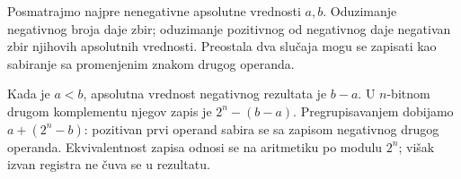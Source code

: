 Posmatrajmo najpre nenegativne apsolutne vrednosti $a,b$. Oduzimanje negativnog broja daje zbir; oduzimanje pozitivnog od negativnog daje negativan zbir njihovih apsolutnih vrednosti. Preostala dva slučaja mogu se zapisati kao sabiranje sa promenjenim znakom drugog operanda.

Kada je $a<b$, apsolutna vrednost negativnog rezultata je $b-a$. U $n$-bitnom drugom komplementu njegov zapis je $2^n-(b-a)$. Pregrupisavanjem dobijamo $a+(2^n-b)$: pozitivan prvi operand sabira se sa zapisom negativnog drugog operanda. Ekvivalentnost zapisa odnosi se na aritmetiku po modulu $2^n$; višak izvan registra ne čuva se u rezultatu.

